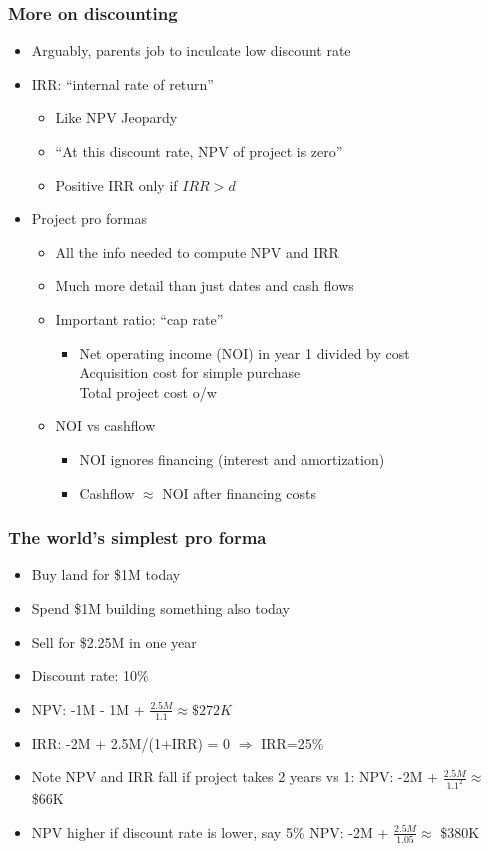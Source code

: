 \documentclass{beamer}
\begin{document}
\begin{frame}
	\frametitle{More on discounting}
	\begin{itemize}
		\item Arguably, parents job to inculcate low discount rate
		\item IRR: ``internal rate of return''
			\begin{itemize}
				\item Like NPV Jeopardy
				\item ``At this discount rate, NPV of project is zero''
				\item Positive IRR only if $IRR>d$
			\end{itemize}
		\item Project pro formas
			\begin{itemize}
				\item All the info needed to compute NPV and IRR
				\item Much more detail than just dates and cash flows
				\item Important ratio: ``cap rate''
					\begin{itemize}
						\item Net operating income (NOI) in year 1 divided by cost\\
								Acquisition cost for simple purchase\\
								Total project cost o/w
					\end{itemize}
				\item NOI vs cashflow
					\begin{itemize}
						\item NOI ignores financing (interest and amortization)
						\item Cashflow $\approx$ NOI after financing costs
					\end{itemize}
			\end{itemize}
	\end{itemize}
\end{frame}

\begin{frame}
	\frametitle{The world's simplest pro forma}
	\begin{itemize}
		\item Buy land for \$1M today
		\item Spend \$1M building something also today
		\item Sell for \$2.25M in one year
		\item Discount rate: 10\%
		\item NPV: -1M - 1M + $\frac{2.5M}{1.1} \approx \$272K$
		\item IRR: -2M + 2.5M/(1+IRR) = 0 $\Rightarrow$ IRR=25\%
		\item Note NPV and IRR fall if project takes 2 years vs 1:
			NPV: -2M + $\frac{2.5M}{1.1^2} \approx$ \$66K\\
		\item NPV higher if discount rate is lower, say 5\%
			NPV: -2M + $\frac{2.5M}{1.05} \approx$ \$380K
	\end{itemize}
\end{frame}
\end{document}
